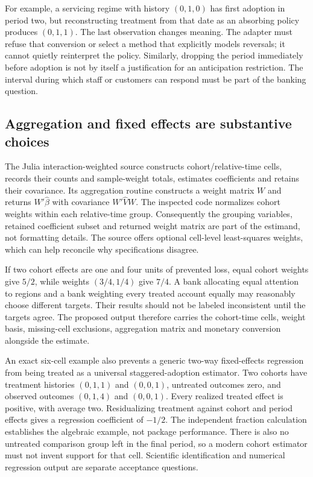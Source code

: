 For example, a servicing regime with history $(0,1,0)$ has first adoption in
period two, but reconstructing treatment from that date as an absorbing policy
produces $(0,1,1)$. The last observation changes meaning. The adapter must
refuse that conversion or select a method that explicitly models reversals;
it cannot quietly reinterpret the policy. Similarly, dropping the period
immediately before adoption is not by itself a justification for an
anticipation restriction. The interval during which staff or customers
can respond must be part of the banking question.~\citep{exec25_panelother_choice}

\subsection{Aggregation and fixed effects are substantive choices}
The Julia interaction-weighted source constructs cohort/relative-time cells,
records their counts and sample-weight totals, estimates coefficients and
retains their covariance. Its aggregation routine constructs a weight matrix
$W$ and returns $W'\widehat\beta$ with covariance $W'\widehat V W$.
The inspected code normalizes cohort weights within each relative-time group.
Consequently the grouping variables, retained coefficient subset and returned
weight matrix are part of the estimand, not formatting details. The source
offers optional cell-level least-squares weights, which can help reconcile
why specifications disagree.~\citep{exec25_panelother_julia}

If two cohort effects are one and four units of prevented loss, equal cohort
weights give $5/2$, while weights $(3/4,1/4)$ give $7/4$. A bank allocating
equal attention to regions and a bank weighting every treated account equally
may reasonably choose different targets. Their results should not be labeled
inconsistent until the targets agree. The proposed output therefore carries
the cohort-time cells, weight basis, missing-cell exclusions, aggregation
matrix and monetary conversion alongside the estimate.~\citep{exec25_panelother_choice}

An exact six-cell example also prevents a generic two-way fixed-effects
regression from being treated as a universal staggered-adoption estimator.
Two cohorts have treatment histories $(0,1,1)$ and $(0,0,1)$, untreated
outcomes zero, and observed outcomes $(0,1,4)$ and $(0,0,1)$. Every realized
treated effect is positive, with average two. Residualizing treatment against
cohort and period effects gives a regression coefficient of $-1/2$.
The independent fraction calculation establishes the algebraic example,
not package performance. There is also no untreated comparison group left
in the final period, so a modern cohort estimator must not invent support
for that cell. Scientific identification and numerical regression output
are separate acceptance questions.~\citep{exec25_panelother_choice}

